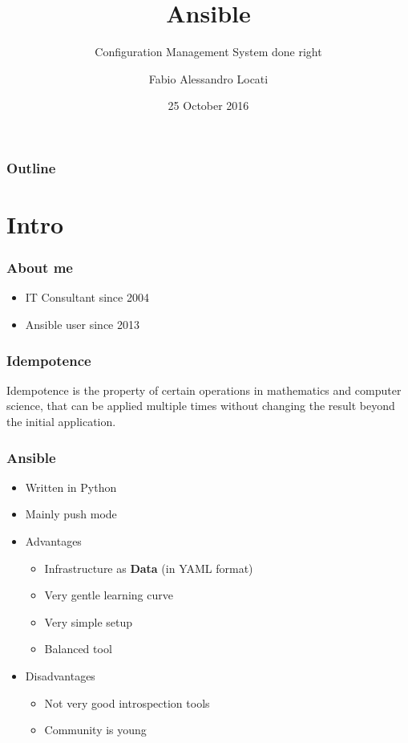 \documentclass[t,aspectratio=169]{beamer}
\title{Ansible}
\subtitle{Configuration Management System done right}
\author{Fabio Alessandro Locati}
\date{25 October 2016}
\begin{document}
\maketitle

\begin{frame}
    \frametitle{Outline}
    \tableofcontents
\end{frame}

\section{Intro}
\begin{frame}
    \frametitle{About me}
    \begin{itemize}
        \item<2-> IT Consultant since 2004
        \item<3-> Ansible user since 2013
    \end{itemize}
\end{frame}

\begin{frame}
    \frametitle{Idempotence}
    \begin{definition}{Idempotence}
    is the property of certain operations in mathematics and computer science, that can be applied multiple times without changing the result beyond the initial application. 
    \end{definition}
\end{frame}

\begin{frame}
    \frametitle{Ansible}
    \begin{itemize}
        \item<2-> Written in Python
        \item<3-> Mainly push mode
        \item<4-> Advantages
        \begin{itemize}
            \item<5-> Infrastructure as \textbf{Data} (in YAML format)
            \item<6-> Very gentle learning curve
            \item<7-> Very simple setup
            \item<8-> Balanced tool
        \end{itemize}
        \item<9-> Disadvantages
        \begin{itemize}
            \item<10-> Not very good introspection tools
            \item<11-> Community is young
        \end{itemize}
    \end{itemize}
\end{frame}
\end{document}
